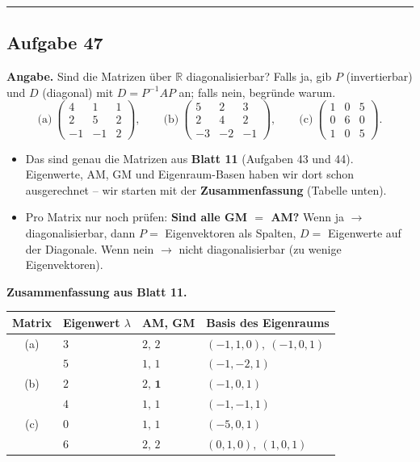 \documentclass[a4paper,12pt]{article}
\newcommand{\EW}{Eigenwert}
\begin{document}
\bigskip
\hrule
\bigskip

\subsection*{Aufgabe 47}

\textbf{Angabe.} Sind die Matrizen \"uber $\mathbb{R}$ diagonalisierbar? Falls ja, gib $P$ (invertierbar) und $D$ (diagonal) mit $D = P^{-1}AP$ an; falls nein, begr\"unde warum.
\[
\text{(a)}\ \begin{pmatrix} 4 & 1 & 1 \\ 2 & 5 & 2 \\ -1 & -1 & 2 \end{pmatrix}, \qquad
\text{(b)}\ \begin{pmatrix} 5 & 2 & 3 \\ 2 & 4 & 2 \\ -3 & -2 & -1 \end{pmatrix}, \qquad
\text{(c)}\ \begin{pmatrix} 1 & 0 & 5 \\ 0 & 6 & 0 \\ 1 & 0 & 5 \end{pmatrix}.
\]

\begin{wastun}
\begin{itemize}[leftmargin=*, nosep]
    \item Das sind genau die Matrizen aus \textbf{Blatt 11} (Aufgaben 43 und 44). Eigenwerte, AM, GM und Eigenraum-Basen haben wir dort schon ausgerechnet -- wir starten mit der \textbf{Zusammenfassung} (Tabelle unten).
    \item Pro Matrix nur noch pr\"ufen: \textbf{Sind alle GM $=$ AM?} Wenn ja $\to$ diagonalisierbar, dann $P =$ Eigenvektoren als Spalten, $D =$ Eigenwerte auf der Diagonale. Wenn nein $\to$ nicht diagonalisierbar (zu wenige Eigenvektoren).
\end{itemize}
\end{wastun}

\textbf{Zusammenfassung aus Blatt 11.}
\begin{center}
\begin{tabular}{@{}clll@{}}
\toprule
Matrix & \EW{} $\lambda$ & AM, GM & Basis des Eigenraums \\
\midrule
(a) & $3$ & $2,\,2$ & $(-1,1,0),\ (-1,0,1)$ \\
    & $5$ & $1,\,1$ & $(-1,-2,1)$ \\[2pt]
(b) & $2$ & $2,\,\mathbf{1}$ & $(-1,0,1)$ \\
    & $4$ & $1,\,1$ & $(-1,-1,1)$ \\[2pt]
(c) & $0$ & $1,\,1$ & $(-5,0,1)$ \\
    & $6$ & $2,\,2$ & $(0,1,0),\ (1,0,1)$ \\
\bottomrule
\end{tabular}
\end{center}
\end{document}
